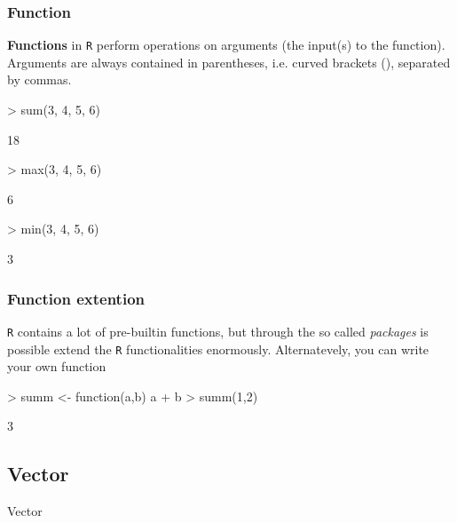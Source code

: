 \documentclass{beamer}
\begin{document}
\begin{frame}[fragile]
	\frametitle{Function}
	\textbf{Functions} in \texttt{R} perform operations on arguments (the input(s) to the function). \\ Arguments are always contained in parentheses, i.e. curved brackets (), separated by commas.
	\vspace{10pt}
	
\begin{Schunk}
\begin{Sinput}
> sum(3, 4, 5, 6)
\end{Sinput}
\begin{Soutput}
[1] 18
\end{Soutput}
\begin{Sinput}
> max(3, 4, 5, 6)
\end{Sinput}
\begin{Soutput}
[1] 6
\end{Soutput}
\begin{Sinput}
> min(3, 4, 5, 6)
\end{Sinput}
\begin{Soutput}
[1] 3
\end{Soutput}
\end{Schunk}

\end{frame}

\begin{frame}[fragile]
	\frametitle{Function extention}
	\texttt{R} contains a lot of pre-builtin functions, but through the so called \textit{packages} is possible extend the \texttt{R} functionalities enormously.
	\vspace{30pt}
	Alternatevely, you can write your own function
\begin{Schunk}
\begin{Sinput}
> summ <- function(a,b){ a + b }
> summ(1,2)
\end{Sinput}
\begin{Soutput}
[1] 3
\end{Soutput}
\end{Schunk}
\end{frame}



\subsection{Vector}
\begin{frame}
	\centering \Huge Vector
\end{frame}
\end{document}
